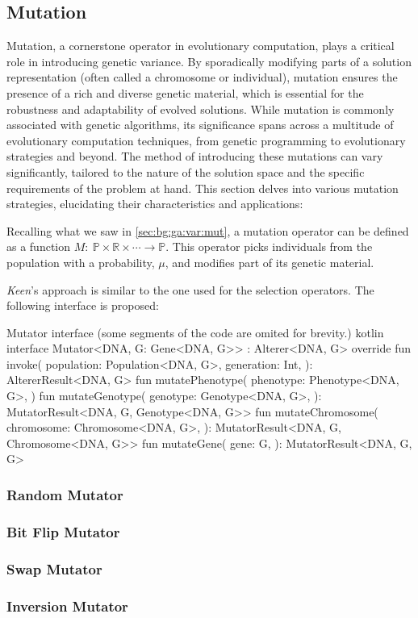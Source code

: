 \subsection{Mutation}
\label{sec:keen:operators:mutation}
  Mutation, a cornerstone operator in evolutionary computation, plays a critical 
  role in introducing genetic variance.
  By sporadically modifying parts of a solution representation (often called a 
  chromosome or individual), mutation ensures the presence of a rich and diverse
  genetic material, which is essential for the robustness and adaptability of 
  evolved solutions.
  While mutation is commonly associated with genetic algorithms, its 
  significance spans across a multitude of evolutionary computation techniques, 
  from genetic programming to evolutionary strategies and beyond.
  The method of introducing these mutations can vary significantly, tailored to 
  the nature of the solution space and the specific requirements of the problem 
  at hand.
  This section delves into various mutation strategies, elucidating their 
  characteristics and applications:

  Recalling what we saw in \vref{sec:bg:ga:var:mut}, a mutation operator can be
  defined as a function \(M :\: \mathbb{P} \times \mathbb{R} \times \cdots \to 
  \mathbb{P}\).
  This operator picks individuals from the population with a probability, 
  \(\mu\), and modifies part of its genetic material.

  \textit{Keen}'s approach is similar to the one used for the selection
  operators.
  The following interface is proposed:

  \begin{code}{
    Mutator interface (some segments of the code are omited for brevity.)
   }{}{kotlin}
    interface Mutator<DNA, G: Gene<DNA, G>> : Alterer<DNA, G> {
        override fun invoke(
            population: Population<DNA, G>,
            generation: Int,
        ): AltererResult<DNA, G> 
        fun mutatePhenotype(
            phenotype: Phenotype<DNA, G>,
        )
        fun mutateGenotype(
            genotype: Genotype<DNA, G>,
        ): MutatorResult<DNA, G, Genotype<DNA, G>>
        fun mutateChromosome(
            chromosome: Chromosome<DNA, G>,
        ): MutatorResult<DNA, G, Chromosome<DNA, G>> 
        fun mutateGene(
            gene: G,
        ): MutatorResult<DNA, G, G>
    }
  \end{code}



\subsubsection{Random Mutator}
\label{sec:keen:operators:mutation:simple}
\Blindtext

\subsubsection{Bit Flip Mutator}
\label{sec:keen:operators:mutation:bit_flip}
\Blindtext

\subsubsection{Swap Mutator}
\label{sec:keen:operators:mutation:swap}
\Blindtext

\subsubsection{Inversion Mutator}
\label{sec:keen:operators:mutation:inversion}
\Blindtext
